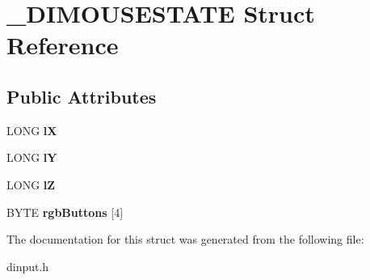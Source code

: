 \hypertarget{struct___d_i_m_o_u_s_e_s_t_a_t_e}{\section{\-\_\-\-D\-I\-M\-O\-U\-S\-E\-S\-T\-A\-T\-E Struct Reference}
\label{struct___d_i_m_o_u_s_e_s_t_a_t_e}
}
\subsection*{Public Attributes}
\begin{DoxyCompactItemize}
\item 
\hypertarget{struct___d_i_m_o_u_s_e_s_t_a_t_e_ae177cb6f1f603d7c7e29ee2d427b7475}{L\-O\-N\-G {\bfseries l\-X}}\label{struct___d_i_m_o_u_s_e_s_t_a_t_e_ae177cb6f1f603d7c7e29ee2d427b7475}

\item 
\hypertarget{struct___d_i_m_o_u_s_e_s_t_a_t_e_ae874e4bce0647479fd0d69bdc41fe752}{L\-O\-N\-G {\bfseries l\-Y}}\label{struct___d_i_m_o_u_s_e_s_t_a_t_e_ae874e4bce0647479fd0d69bdc41fe752}

\item 
\hypertarget{struct___d_i_m_o_u_s_e_s_t_a_t_e_aa1ff0d8dd371badf3559762ecf1852b8}{L\-O\-N\-G {\bfseries l\-Z}}\label{struct___d_i_m_o_u_s_e_s_t_a_t_e_aa1ff0d8dd371badf3559762ecf1852b8}

\item 
\hypertarget{struct___d_i_m_o_u_s_e_s_t_a_t_e_a058065ed3f6767cd4bd3cfb515de2c04}{B\-Y\-T\-E {\bfseries rgb\-Buttons} \mbox{[}4\mbox{]}}\label{struct___d_i_m_o_u_s_e_s_t_a_t_e_a058065ed3f6767cd4bd3cfb515de2c04}

\end{DoxyCompactItemize}


The documentation for this struct was generated from the following file\-:\begin{DoxyCompactItemize}
\item 
dinput.\-h\end{DoxyCompactItemize}
